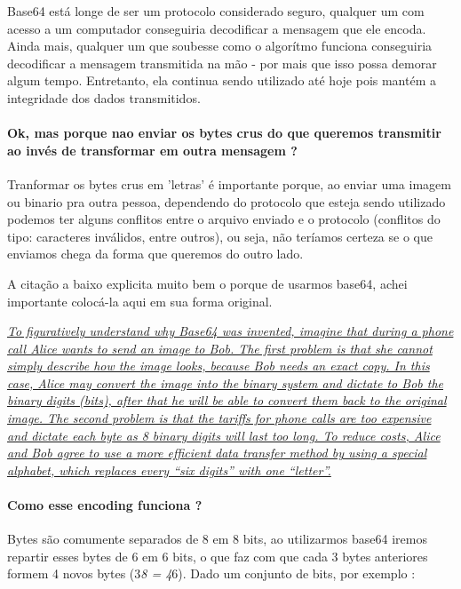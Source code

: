\documentclass[11pt]{article}
\begin{document}
Base64 está longe de ser um protocolo considerado seguro, qualquer um
com acesso a um computador conseguiria decodificar a mensagem que ele
encoda. Ainda mais, qualquer um que soubesse como o algorítmo funciona
conseguiria decodificar a mensagem transmitida na mão - por mais que
isso possa demorar algum tempo. Entretanto, ela continua sendo utilizado
até hoje pois mantém a integridade dos dados transmitidos.

\paragraph{Ok, mas porque nao enviar os bytes crus do que queremos
transmitir ao invés de transformar em outra mensagem
?}\label{ok-mas-porque-nao-enviar-os-bytes-crus-do-que-queremos-transmitir-ao-invuxe9s-de-transformar-em-outra-mensagem}

Tranformar os bytes crus em 'letras' é importante porque, ao enviar uma
imagem ou binario pra outra pessoa, dependendo do protocolo que esteja
sendo utilizado podemos ter alguns conflitos entre o arquivo enviado e o
protocolo (conflitos do tipo: caracteres inválidos, entre outros), ou
seja, não teríamos certeza se o que enviamos chega da forma que queremos
do outro lado.

A citação a baixo explicita muito bem o porque de usarmos base64, achei
importante colocá-la aqui em sua forma original.

\href{https://base64.guru/learn/what-is-base64}{\emph{To figuratively
understand why Base64 was invented, imagine that during a phone call
Alice wants to send an image to Bob. The first problem is that she
cannot simply describe how the image looks, because Bob needs an exact
copy. In this case, Alice may convert the image into the binary system
and dictate to Bob the binary digits (bits), after that he will be able
to convert them back to the original image. The second problem is that
the tariffs for phone calls are too expensive and dictate each byte as 8
binary digits will last too long. To reduce costs, Alice and Bob agree
to use a more efficient data transfer method by using a special
alphabet, which replaces every ``six digits'' with one ``letter''.}}

\paragraph{Como esse encoding funciona
?}\label{como-esse-encoding-funciona}

Bytes são comumente separados de 8 em 8 bits, ao utilizarmos base64
iremos repartir esses bytes de 6 em 6 bits, o que faz com que cada 3
bytes anteriores formem 4 novos bytes (3\emph{8 = 4}6). Dado um conjunto
de bits, por exemplo :
\end{document}
